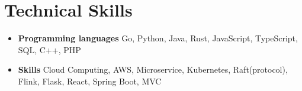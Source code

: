 \documentclass[a4,12pt]{article}
\newenvironment{zitemize}{
\begin{itemize}\itemsep0pt \parskip0pt \parsep1pt}
{\end{itemize}\vspace{-0.5cm}}
\begin{document}



\vspace{-0.4cm}
\section{\textbf{Technical Skills}}
\vspace{-0.2cm}
\begin{zitemize}
    \item \textbf{Programming languages} Go, Python, Java, Rust, JavaScript, TypeScript, SQL, C++, PHP
    \item \textbf{Skills} Cloud Computing, AWS, Microservice, Kubernetes, Raft(protocol), Flink, Flask, React, Spring Boot, MVC
\end{zitemize}
\end{document}
